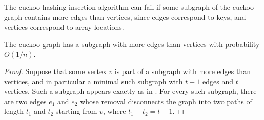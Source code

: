 \documentclass{patmorin}
\begin{document}
The cuckoo hashing insertion algorithm can fail if some subgraph of
the cuckoo graph contains more edges than vertices, since edges
correspond to keys, and vertices correspond to array locations.
\begin{lem}
  The cuckoo graph has a subgraph with more edges than vertices with
  probability $O(1/n)$.
\end{lem}
\begin{proof}
  Suppose that some vertex $v$ is part of a subgraph with more edges
  than vertices, and in particular a minimal such subgraph with $t +
  1$ edges and $t$ vertices. Such a subgraph appears exactly as in
  . For every such subgraph, there are two edges
  $e_1$ and $e_2$ whose removal disconnects the graph into two paths
  of length $t_1$ and $t_2$ starting from $v$, where $t_1 + t_2 = t -
  1$.


\end{proof}
\end{document}
